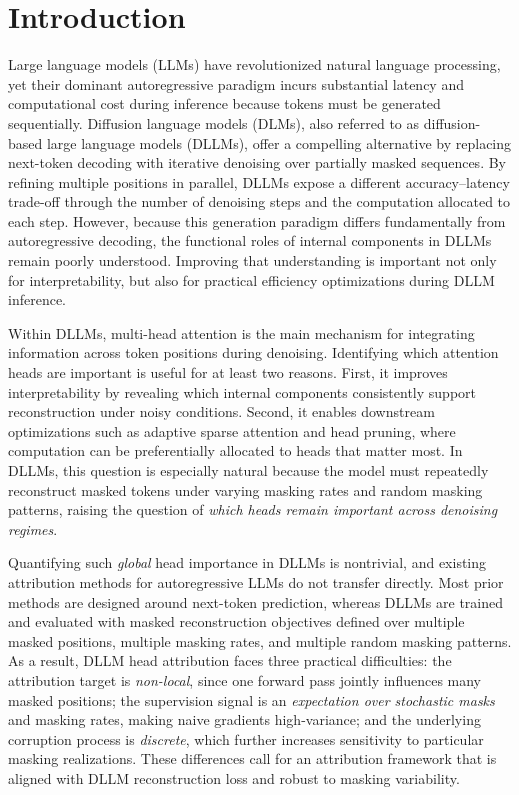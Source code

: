 \section{Introduction}
Large language models (LLMs) have revolutionized natural language processing, yet their dominant autoregressive paradigm incurs substantial latency and computational cost during inference because tokens must be generated sequentially. Diffusion language models (DLMs), also referred to as diffusion-based large language models (DLLMs), offer a compelling alternative by replacing next-token decoding with iterative denoising over partially masked sequences. By refining multiple positions in parallel, DLLMs expose a different accuracy--latency trade-off through the number of denoising steps and the computation allocated to each step. However, because this generation paradigm differs fundamentally from autoregressive decoding, the functional roles of internal components in DLLMs remain poorly understood. Improving that understanding is important not only for interpretability, but also for practical efficiency optimizations during DLLM inference.

Within DLLMs, multi-head attention is the main mechanism for integrating information across token positions during denoising. Identifying which attention heads are important is useful for at least two reasons. First, it improves interpretability by revealing which internal components consistently support reconstruction under noisy conditions. Second, it enables downstream optimizations such as adaptive sparse attention and head pruning, where computation can be preferentially allocated to heads that matter most. In DLLMs, this question is especially natural because the model must repeatedly reconstruct masked tokens under varying masking rates and random masking patterns, raising the question of \emph{which heads remain important across denoising regimes}.

Quantifying such \emph{global} head importance in DLLMs is nontrivial, and existing attribution methods for autoregressive LLMs do not transfer directly. Most prior methods are designed around next-token prediction, whereas DLLMs are trained and evaluated with masked reconstruction objectives defined over multiple masked positions, multiple masking rates, and multiple random masking patterns. As a result, DLLM head attribution faces three practical difficulties: the attribution target is \emph{non-local}, since one forward pass jointly influences many masked positions; the supervision signal is an \emph{expectation over stochastic masks} and masking rates, making naive gradients high-variance; and the underlying corruption process is \emph{discrete}, which further increases sensitivity to particular masking realizations. These differences call for an attribution framework that is aligned with DLLM reconstruction loss and robust to masking variability.

